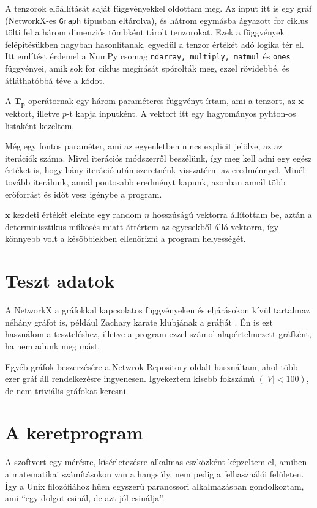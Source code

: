 \documentclass[12pt,numbers=noenddot]{report}
\begin{document}
A tenzorok előállítását saját függvényekkel oldottam meg. 
Az input itt is egy gráf (NetworkX-es \texttt{Graph} típusban eltárolva),
és hátrom egymásba ágyazott for ciklus tölti fel a három dimenziós tömbként tárolt tenzorokat.
Ezek a függvények felépítésükben nagyban hasonlítanak, egyedül a tenzor értékét adó logika tér el.
Itt említést érdemel a NumPy csomag \texttt{ndarray, multiply, matmul} és \texttt{ones} függvényei,
amik sok for ciklus megírását spórolták meg, ezzel rövidebbé, és átláthatóbbá téve a kódot.

A $\boldsymbol{T_p}$ operátornak egy három paraméteres függvényt írtam, ami a tenzort, 
az $\boldsymbol{x}$ vektort, illetve $p$-t kapja inputként. 
A vektort itt egy hagyományos pyhton-os listaként kezeltem.

Még egy fontos paraméter, ami az egyenletben nincs explicit jelölve, az az iterációk száma.
Mivel iterációs módszerről beszélünk, így meg kell adni egy egész értéket is, 
hogy hány iteráció után szeretnénk visszatérni az eredménnyel. Minél tovább iterálunk,
annál pontosabb eredményt kapunk, azonban annál több erőforrást és időt vesz igénybe a program.

$\boldsymbol{x}$ kezdeti értékét eleinte egy random $n$ hosszúságú vektorra állítottam be,
aztán a determinisztikus műkösés miatt áttértem az egyesekből álló vektorra, így 
könnyebb volt a későbbiekben ellenőrizni a program helyességét.


\section{Teszt adatok}

A NetworkX a gráfokkal kapcsolatos függvényeken és eljárásokon kívül 
tartalmaz néhány gráfot is, például Zachary karate klubjának a gráfját \cite{karate-club}.
Én is ezt használom a teszteléshez, illetve a program ezzel számol 
alapértelmezett gráfként, ha nem adunk meg mást.

Egyéb gráfok beszerzésére a Netwrok Repository \cite{network-repository}
oldalt használtam, ahol több ezer gráf áll rendelkezésre ingyenesen. 
Igyekeztem kisebb fokszámú $(|V|<100)$, de nem triviális gráfokat keresni.


\section{A keretprogram}
A szoftvert egy mérésre, kísérletezésre alkalmas eszközként képzeltem el,
amiben a matematikai számításokon van a hangsúly, nem pedig a felhasználói felületen.
Így a Unix filozófiához hűen egyszerű parancssori alkalmazásban gondolkoztam,
ami ``egy dolgot csinál, de azt jól csinálja''.
\end{document}
